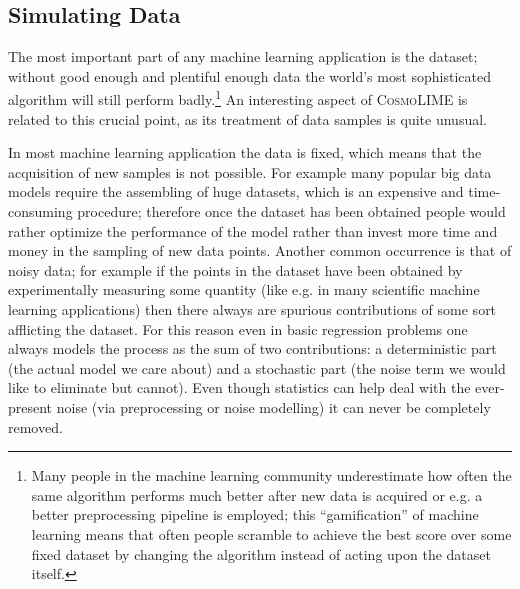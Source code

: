 
\subsection{Simulating Data}\label{subsec:simulating_data}
The most important part of any machine learning application is the dataset; without good enough and plentiful enough data the world's most sophisticated algorithm will still perform badly.\footnote{Many people in the machine learning community underestimate how often the same algorithm performs much better after new data is acquired or e.g. a better preprocessing pipeline is employed; this ``gamification'' of machine learning means that often people scramble to achieve the best score over some fixed dataset by changing the algorithm instead of acting upon the dataset itself.} An interesting aspect of \textsc{CosmoLIME} is related to this crucial point, as its treatment of data samples is quite unusual.

In most machine learning application the data is fixed, which means that the acquisition of new samples is not possible. For example many popular big data models require the assembling of huge datasets, which is an expensive and time-consuming procedure; therefore once the dataset has been obtained people would rather optimize the performance of the model rather than invest more time and money in the sampling of new data points.
Another common occurrence is that of noisy data; for example if the points in the dataset have been obtained by experimentally measuring some quantity (like e.g. in many scientific machine learning applications) then there always are spurious contributions of some sort afflicting the dataset. For this reason even in basic regression problems one always models the process as the sum of two contributions: a deterministic part (the actual model we care about) and a stochastic part (the noise term we would like to eliminate but cannot). Even though statistics can help deal with the ever-present noise (via preprocessing or noise modelling) it can never be completely removed.

